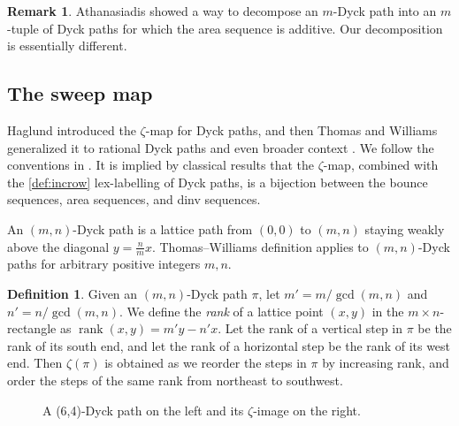 \documentclass[12pt,reqno]{amsart}
\theoremstyle{definition}
\newtheorem{definition}{Definition}
\newtheorem{remark}{Remark}
\DeclareMathOperator{\rank}{rank}
\begin{document}
\begin{remark}
Athanasiadis \cite{MR2098091} showed a way to decompose an $m$-Dyck path into an $m$-tuple of Dyck paths for which the area sequence is additive. Our decomposition is essentially different.
\end{remark}

\subsection{The sweep map}
Haglund introduced the $\zeta$-map for Dyck paths\cite{MR2163448}, and then Thomas and Williams generalized it to rational Dyck paths and even broader context \cite{MR2371044}. 
We follow the conventions in \cite{MR3787405}.
It is implied by classical results that the $\zeta$-map, combined with the \cref{def:incrow} lex-labelling of Dyck paths, is a bijection between the bounce sequences, area sequences, and dinv sequences.

An $(m,n)$-Dyck path is a lattice path from $(0,0)$ to $(m,n)$ staying weakly above the diagonal $y = \frac{n}{m}x$. 
Thomas--Williams definition applies to $(m,n)$-Dyck paths for arbitrary positive integers $m,n$.
\begin{definition}\label{def:rank}
Given an $(m,n)$-Dyck path $\pi$, 
let $m' = m/\gcd(m,n)$ and $n' = n/\gcd(m,n)$.
We define the \emph{rank} of a lattice point $(x,y)$ in the $m \times n$-rectangle as
$\rank(x,y) = m' y - n' x.$
Let the rank of a vertical step in $\pi$ be the rank of its south end, and let the rank of a horizontal step be the rank of its west end.
Then $\zeta(\pi)$ is obtained as we reorder the steps in $\pi$ by increasing rank, and order the steps of the same rank from northeast to southwest.
\end{definition}

\begin{figure}[H]
\centering
{} 
\caption{A (6,4)-Dyck path on the left and its $\zeta$-image on the right.}
\label{fig:64}
\end{figure}
\end{document}
